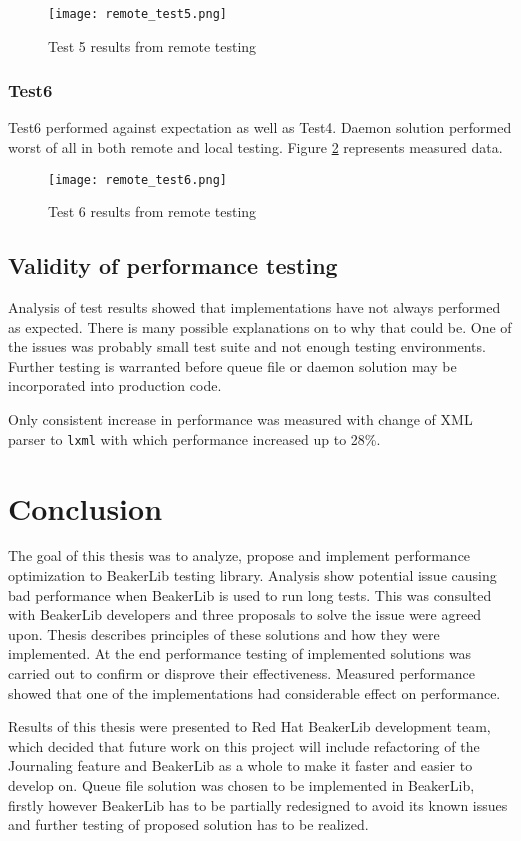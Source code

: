 \begin{figure}
  \texttt{[image: remote\_test5.png]}
  \caption{Test 5 results from remote testing}
  \label{fig:remote_test5}
\end{figure}


\subsection{Test6}
Test6 performed against expectation as well as Test4. Daemon solution performed worst of all in both remote and local testing. Figure \ref{fig:remote_test6} represents measured data.

\begin{figure}
  \texttt{[image: remote\_test6.png]}
  \caption{Test 6 results from remote testing}
  \label{fig:remote_test6}
\end{figure}

\section{Validity of performance testing}
Analysis of test results showed that implementations have not always performed as expected. There is many possible explanations on to why that could be. One of the issues was probably small test suite and not enough testing environments. Further testing is warranted before queue file or daemon solution may be incorporated into production code.

Only consistent increase in performance was measured with change of XML parser to \texttt{lxml} with which performance increased up to 28\%.



\chapter{Conclusion}
\label{conclusion}
The goal of this thesis was to analyze, propose and implement performance optimization to BeakerLib testing library. Analysis show potential issue causing bad performance when BeakerLib is used to run long tests. This was consulted with BeakerLib developers and three proposals to solve the issue were agreed upon. Thesis describes principles of these solutions and how they were implemented. At the end performance testing of implemented solutions was carried out to confirm or disprove their effectiveness. Measured performance showed that one of the implementations had considerable effect on performance.

Results of this thesis were presented to Red Hat BeakerLib development team, which decided that future work on this project will include refactoring of the Journaling feature and BeakerLib as a whole to make it faster and easier to develop on. Queue file solution was chosen to be implemented in BeakerLib,  firstly however BeakerLib has to be partially redesigned to avoid its known issues and further testing of proposed solution has to be realized.

